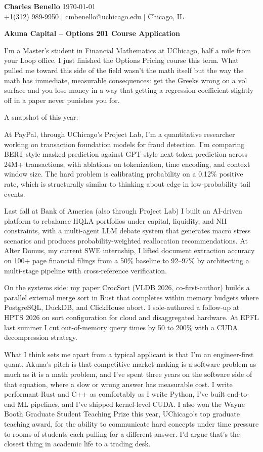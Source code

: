 \documentclass[letterpaper,11pt]{article}
\begin{document}
\noindent\textbf{\large Charles Benello} \hfill \today \\
\noindent +1(312) 989-9950 $|$ cmbenello@uchicago.edu $|$ Chicago, IL

\vspace{8pt}

\noindent\textbf{Akuna Capital -- Options 201 Course Application}

\vspace{4pt}

I'm a Master's student in Financial Mathematics at UChicago, half a mile from your Loop office. I just finished the Options Pricing course this term. What pulled me toward this side of the field wasn't the math itself but the way the math has immediate, measurable consequences: get the Greeks wrong on a vol surface and you lose money in a way that getting a regression coefficient slightly off in a paper never punishes you for.

A snapshot of this year:

At PayPal, through UChicago's Project Lab, I'm a quantitative researcher working on transaction foundation models for fraud detection. I'm comparing BERT-style masked prediction against GPT-style next-token prediction across 24M+ transactions, with ablations on tokenization, time encoding, and context window size. The hard problem is calibrating probability on a 0.12\% positive rate, which is structurally similar to thinking about edge in low-probability tail events.

Last fall at Bank of America (also through Project Lab) I built an AI-driven platform to rebalance HQLA portfolios under capital, liquidity, and NII constraints, with a multi-agent LLM debate system that generates macro stress scenarios and produces probability-weighted reallocation recommendations. At Alter Domus, my current SWE internship, I lifted document extraction accuracy on 100+ page financial filings from a 50\% baseline to 92--97\% by architecting a multi-stage pipeline with cross-reference verification.

On the systems side: my paper CrocSort (VLDB 2026, co-first-author) builds a parallel external merge sort in Rust that completes within memory budgets where PostgreSQL, DuckDB, and ClickHouse abort. I sole-authored a follow-up at HPTS 2026 on sort configuration for cloud and disaggregated hardware. At EPFL last summer I cut out-of-memory query times by 50 to 200\% with a CUDA decompression strategy.

What I think sets me apart from a typical applicant is that I'm an engineer-first quant. Akuna's pitch is that competitive market-making is a software problem as much as it is a math problem, and I've spent three years on the software side of that equation, where a slow or wrong answer has measurable cost. I write performant Rust and C++ as comfortably as I write Python, I've built end-to-end ML pipelines, and I've shipped kernel-level CUDA. I also won the Wayne Booth Graduate Student Teaching Prize this year, UChicago's top graduate teaching award, for the ability to communicate hard concepts under time pressure to rooms of students each pulling for a different answer. I'd argue that's the closest thing in academic life to a trading desk.
\end{document}
